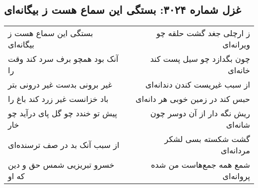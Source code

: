 \begin{center}
\section*{غزل شماره ۳۰۲۴: بستگی این سماع هست ز بیگانه‌ای}
\label{sec:3024}
\begin{longtable}{l p{0.5cm} r}
بستگی این سماع هست ز بیگانه‌ای
&&
ز ارچلی جغد گشت حلقه چو ویرانه‌ای
\\
آنک بود همچو برف سرد کند وقت را
&&
چون بگدازد چو سیل پست کند خانه‌ای
\\
غیر برونی بدست غیر درونی بتر
&&
از سبب غیریست کندن دندانه‌ای
\\
باد خزانست غیر زرد کند باغ را
&&
حبس کند در زمین خوبی هر دانه‌ای
\\
پیش تو خندد چو گل پای درآید چو خار
&&
ریش نگه دار از آن دوسر چون شانه‌ای
\\
از سبب آنک بد در صف ترسنده‌ای
&&
گشت شکسته بسی لشکر مردانه‌ای
\\
خسرو تبریزیی شمس حق و دین که او
&&
شمع همه جمع‌هاست من شده پروانه‌ای
\\
\end{longtable}
\end{center}
